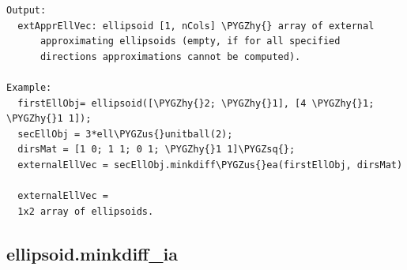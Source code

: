\documentclass[letterpaper,10pt,english]{sphinxmanual}
\def\PYGZus{\char`\_}
\def\PYGZhy{\char`\-}
\def\PYGZsq{\char`\'}
\begin{document}
\begin{Verbatim}[commandchars=\\\{\}]
Output:
  extApprEllVec: ellipsoid [1, nCols] \PYGZhy{} array of external
      approximating ellipsoids (empty, if for all specified
      directions approximations cannot be computed).

Example:
  firstEllObj= ellipsoid([\PYGZhy{}2; \PYGZhy{}1], [4 \PYGZhy{}1; \PYGZhy{}1 1]);
  secEllObj = 3*ell\PYGZus{}unitball(2);
  dirsMat = [1 0; 1 1; 0 1; \PYGZhy{}1 1]\PYGZsq{};
  externalEllVec = secEllObj.minkdiff\PYGZus{}ea(firstEllObj, dirsMat)

  externalEllVec =
  1x2 array of ellipsoids.
\end{Verbatim}


\subsection{ellipsoid.minkdiff\_ia}
\label{chap_functions:ellipsoid-minkdiff-ia}
\end{document}
